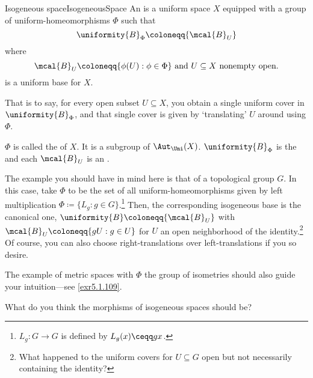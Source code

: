 \begin{dfn}{Isogeneous space}{IsogeneousSpace}
An  is a uniform space $X$ equipped with a group of uniform-homeomorphisms $\Phi$ such that
\begin{equation}\label{5.1.28}
\uniformity{B}_\Phi \coloneqq \{ \mcal{B}_U\}
\end{equation}
where
\begin{equation*}
\mcal{B}_U\coloneqq \{ \phi (U):\phi \in \Phi\} \text{ and }U\subseteq X\text{ nonempty open}.
\end{equation*}
is a uniform base for $X$.
\begin{rmk}
That is to say, for every open subset $U\subseteq X$, you obtain a single uniform cover in $\uniformity{B}_{\Phi}$, and that single cover is given by `translating' $U$ around using $\Phi$.
\end{rmk}
\begin{rmk}
$\Phi$ is called the  of $X$.  It is a subgroup of $\Aut _{\Uni}(X)$.  $\uniformity{B}_{\Phi}$ is the  and each $\mcal{B}_U$ is an .
\end{rmk}
\begin{rmk}
The example you should have in mind here is that of a topological group $G$.  In this case, take $\Phi$ to be the set of all uniform-homeomorphisms given by left multiplication $\Phi \coloneqq \{ L_g:g\in G\}$.\footnote{$L_g\colon G\rightarrow G$ is defined by $L_g(x)\ceqq gx$.}  Then, the corresponding isogeneous base is the canonical one, $\uniformity{B}\coloneqq \{ \mcal{B}_U\}$ with $\mcal{B}_U\coloneqq \{ gU:g\in U\}$ for $U$ an open neighborhood of the identity.\footnote{What happened to the uniform covers for $U\subseteq G$ open but not necessarily containing the identity?}  Of course, you can also choose right-translations over left-translations if you so desire.
\end{rmk}
\begin{rmk}
The example of metric spaces with $\Phi$ the group of isometries should also guide your intuition---see \cref{exr5.1.109}.
\end{rmk}
\begin{rmk}
What do you think the morphisms of isogeneous spaces should be?
\end{rmk}
\end{dfn}
